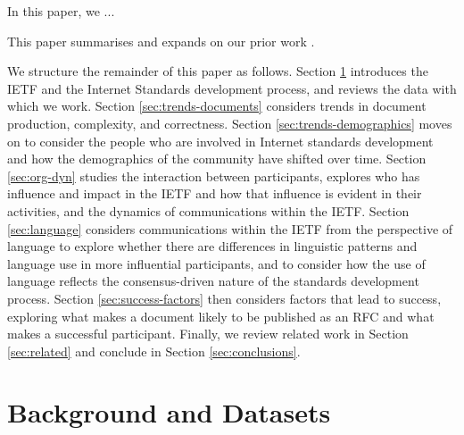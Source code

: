 \documentclass[twocolumn,10pt]{article}
\begin{document}
In this paper, we ...



This paper summarises and expands on our prior work
\cite{mcquistin:2021:characterising,khare:2022:web-we-weave,
healey:2023:power,mcquistin:2023:errare,khare:2023:tracing,
karan:2023:leda,healey:2023:power-frontiers,barnes:2024:temporal}.


We structure the remainder of this paper as follows.
Section \ref{sec:background} introduces the IETF and the Internet Standards
development process, and reviews the data with which we work.
Section \ref{sec:trends-documents} considers trends in document production,
complexity, and correctness.
Section \ref{sec:trends-demographics} moves on to consider the people who
are involved in Internet standards development and how the demographics of
the community have shifted over time.
Section \ref{sec:org-dyn} studies the interaction between participants,
explores who has influence and impact in the IETF and how that influence
is evident in their activities, and the dynamics of communications within
the IETF.
Section \ref{sec:language} considers communications within the IETF from
the perspective of language to explore whether there are differences in
linguistic patterns and language use in more influential participants,
and to consider how the use of language reflects the consensus-driven
nature of the standards development process.
Section \ref{sec:success-factors} then considers factors that lead to
success, exploring what makes a document likely to be published as an
RFC and what makes a successful participant.
Finally, we review related work in Section \ref{sec:related} and conclude
in Section \ref{sec:conclusions}.

\section{Background and Datasets}
\label{sec:background}
\end{document}
